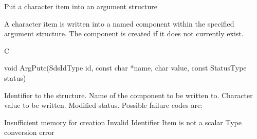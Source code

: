 \begin{manroutinedescription}
      Put a character item into an argument structure

      A character item is written into a named component within the
      specified argument structure. The component is created if it
      does not currently exist.
 
      C

      void ArgPutc(SdsIdType id, const char *name, char value, const %
StatusType {\mantt{*}} status)
 
\begin{manparametertable}
 Identifier to the structure.
 Name of the component to be %
written to.
  Character value to be written.
 Modified status. Possible %
failure codes are:
\end{manparametertable}
\begin{mantwocolumntable}
Insufficient memory for creation
Invalid Identifier
Item is not a scalar
Type conversion error
\end{mantwocolumntable}
\end{manroutinedescription}
